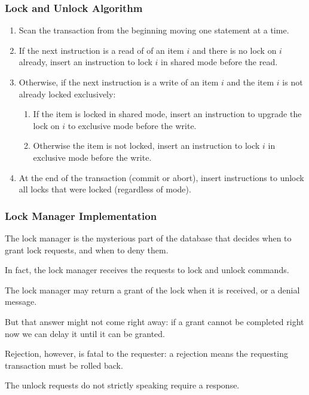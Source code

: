 \begin{frame}
\frametitle{Lock and Unlock Algorithm}

\begin{enumerate}
	\item Scan the transaction from the beginning moving one statement at a time.
	\item If the next instruction is a read of of an item $i$ and there is no lock on $i$ already, insert an instruction to lock $i$ in shared mode before the read.
	\item Otherwise, if the next instruction is a write of an item $i$ and the item $i$ is not already locked exclusively:
		\begin{enumerate}
			\item If the item is locked in shared mode, insert an instruction to upgrade the lock on $i$ to exclusive mode before the write.
			\item Otherwise the item is not locked, insert an instruction to lock $i$ in exclusive mode before the write.
		\end{enumerate}
	\item At the end of the transaction (commit or abort), insert instructions to unlock all locks that were locked (regardless of mode).
\end{enumerate}


\end{frame}

\begin{frame}
\frametitle{Lock Manager Implementation}

The lock manager is the mysterious part of the database that decides when to grant lock requests, and when to deny them. 

In fact, the lock manager receives the requests to lock and unlock commands. 

The lock manager may return a grant of the lock when it is received, or a denial message. 

But that answer might not come right away: if a grant cannot be completed right now we can delay it until it can be granted. 

Rejection, however, is fatal to the requester: a rejection means the requesting transaction must be rolled back. 

The unlock requests do not strictly speaking require a response.


\end{frame}

